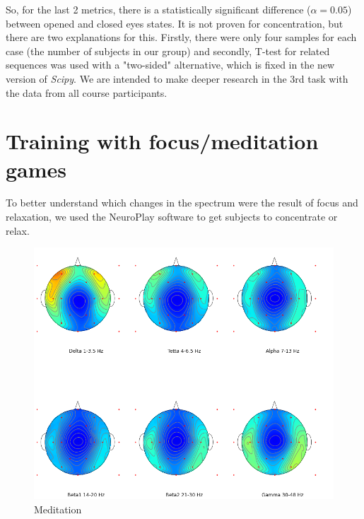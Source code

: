 \documentclass[9pt,twocolumn,twoside]{osajnl}
\begin{document}
So, for the last 2 metrics, there is a statistically significant difference ($\alpha=0.05$) between opened and closed eyes states. It is not proven for concentration, but there are two explanations for this. Firstly, there were only four samples for each case (the number of subjects in our group) and secondly, T-test for related sequences was used with a "two-sided" alternative, which is fixed in the new version of \textit{Scipy}. We are intended to make deeper research in the 3rd task with the data from all course participants.

\section{Training with focus/meditation games}

To better understand which changes in the spectrum were the result of focus and relaxation, we used the NeuroPlay software to get subjects to concentrate or relax. 



\begin{figure}[htbp]
\centering
\includegraphics[width=\linewidth]{image_2022-05-12_17-19-49.png}
\caption{Meditation}
\label{fig:false-color}
\end{figure}
\end{document}
